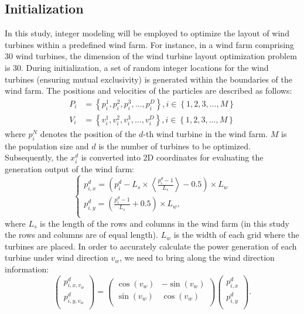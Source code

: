 \documentclass[review]{elsarticle}
\begin{document}
\subsection{Initialization}
In this study, integer modeling will be employed to optimize the layout of wind turbines within a predefined wind farm. For instance, in a wind farm comprising 30 wind turbines, the dimension of the wind turbine layout optimization problem is 30. During initialization, a set of random integer locations for the wind turbines (ensuring mutual exclusivity) is generated within the boundaries of the wind farm. The positions and velocities of the particles are described as follows:
\begin{align}
	\label{init}
	P_{i}&=\left\{p_{i}^{1},p_{i}^{2},p_{i}^{3},...,p_{i}^{D}\right\}, i\in \left\{1,2,3,...,M\right\}\\
	V_{i}&=\left\{v_{i}^{1},v_{i}^{2},v_{i}^{3},...,v_{i}^{D}\right\}, i\in \left\{1,2,3,...,M\right\}
\end{align}
where $p_i^{N}$ denotes the position of the $d$-th wind turbine in the wind farm. $M$ is the population size and $d$ is the number of turbines to be optimized. Subsequently, the $x_{i}^{d}$ is converted into 2D coordinates for evaluating the generation output of the wind farm:
\begin{equation}
	\label{2dcoor}
	\begin{cases}
		p_{i,x}^{d} = \left(p_i^d-L_s\times\left\langle\frac{p_i^d-1}{L_s}\right\rangle-0.5\right)\times L_w \\
		p_{i,y}^{d} = \left(\frac{p_i^d-1}{L_s}+0.5\right)\times L_w, \\
	\end{cases}
\end{equation}
where $L_s$ is the length of the rows and columns in the wind farm (in this study the rows and columns are of equal length). $L_w$ is the width of each grid where the turbines are placed. In order to accurately calculate the power generation of each turbine under wind direction $v_w$, we need to bring along the wind direction information:
\begin{equation}
	\begin{pmatrix}
		p_{i,x,v_w}^{d} \\
		p_{i,y,v_w}^{d} \\
	\end{pmatrix}
	=
	\begin{pmatrix}
		\cos(v_w) & -\sin(v_w)\\
		\sin(v_w) & \cos(v_w) \\
	\end{pmatrix}
	\begin{pmatrix}
		p_{i,x}^{d} \\
		p_{i,y}^{d} \\
	\end{pmatrix}.
\end{equation}
\end{document}
